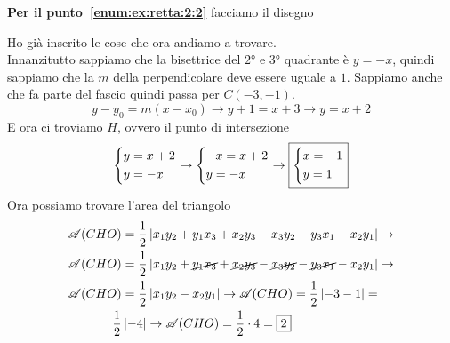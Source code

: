 \textbf{Per il punto~\ref{enum:ex:retta:2:2}} facciamo il disegno
\begin{center}
\end{center}
Ho già inserito le cose che ora andiamo a trovare.\\
Innanzitutto sappiamo che la bisettrice del $\ang{2}$ e $\ang{3}$ quadrante è $y=-x$, quindi sappiamo
che la $m$ della perpendicolare deve essere uguale a $1$. Sappiamo anche che fa parte del fascio 
quindi passa per $C(-3,-1)$.
\begin{equation*}
y-y_0 = m(x-x_0) \rightarrow y+1 = x+3 \rightarrow \boxed{y = x+2}
\end{equation*}
E ora ci troviamo $H$, ovvero il punto di intersezione
\begin{equation*}
\begin{dcases}
y = x+2\\
y = -x
\end{dcases} \rightarrow
\begin{dcases}
-x = x+2\\
y = -x
\end{dcases} \rightarrow
\boxed{\begin{dcases}
x = -1\\
y = 1
\end{dcases}}
\end{equation*}
Ora possiamo trovare l'area del triangolo
\begin{align*}
\mathscr{A}(CHO) &= \frac{1}{2}\left\lvert x_1y_2 + y_1x_3 + x_2y_3 -x_3y_2 -y_3x_1-x_2y_1\right\rvert
\rightarrow\\
\mathscr{A}(CHO) &= \frac{1}{2}\left\lvert x_1y_2 + \cancel{y_1x_3} + \cancel{x_2y_3} 
-\cancel{x_3y_2} -\cancel{y_3x_1} -x_2y_1\right\rvert \rightarrow \\
\mathscr{A}(CHO) &= \frac{1}{2}\left\lvert x_1y_2 -x_2y_1\right\rvert \rightarrow
\mathscr{A}(CHO) = \frac{1}{2}\left\lvert -3 -1\right\rvert =\\
\frac{1}{2}&\left\lvert-4\right\rvert \rightarrow \mathscr{A}(CHO) = \frac{1}{2}\cdot4 = \boxed{2}
\end{align*}

